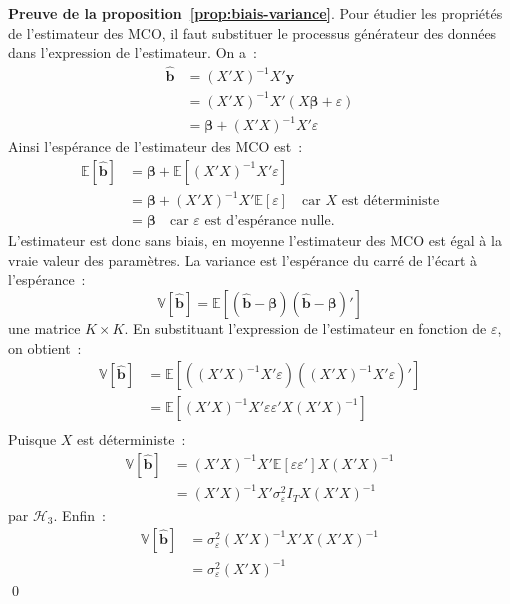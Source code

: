 \documentclass[10pt,a4paper]{article}
\theoremstyle{definition}
\begin{document}
\begin{notes}

  \textbf{Preuve de la proposition~\ref{prop:biais-variance}}. Pour étudier les propriétés de l'estimateur des MCO, il faut substituer le processus générateur des données dans l'expression de l'estimateur. On a~:
  \[
    \begin{split}
      \hat{\mathbf b} &= (X'X)^{-1}X'\mathbf y\\
                      &= (X'X)^{-1}X'\left( X\bm \beta + \varepsilon \right)\\
                      &= \bm \beta + (X'X)^{-1}X'\varepsilon
    \end{split}
  \]
  Ainsi l'espérance de l'estimateur des MCO est~:
  \[
    \begin{split}
      \mathbb E \left[ \hat{\mathbf b} \right] &= \bm \beta + \mathbb E\left[ (X'X)^{-1}X'\varepsilon \right]\\
                                               &= \bm \beta + (X'X)^{-1}X'\mathbb E\left[ \varepsilon \right]\quad\text{car $X$ est déterministe}\\
                                               &= \bm \beta\quad\text{car $\varepsilon$  est d'espérance nulle.}
    \end{split}
  \]
  L'estimateur est donc sans biais, en moyenne l'estimateur des MCO est égal à la vraie valeur des paramètres. La variance est l'espérance du carré de l'écart à l'espérance~:
  \[
    \mathbb V\left[ \hat{\mathbf b} \right] = \mathbb E\left[\left( \hat{\mathbf b}- \bm\beta \right)\left( \hat{\mathbf b}- \bm\beta \right)'\right]
  \]
  une matrice $K\times K$. En substituant l'expression de l'estimateur en fonction de $\varepsilon$, on obtient~:
\[
    \begin{split}
      \mathbb V\left[ \hat{\mathbf b} \right] &= \mathbb E\left[ \left( (X'X)^{-1}X'\varepsilon \right)\left( (X'X)^{-1}X'\varepsilon \right)' \right]\\
                                              &= \mathbb E\left[ (X'X)^{-1}X'\varepsilon\varepsilon' X (X'X)^{-1} \right]\\
    \end{split}
  \]
Puisque $X$ est déterministe~:
  \[
    \begin{split}
      \mathbb V\left[ \hat{\mathbf b} \right]
                                              &= (X'X)^{-1}X' \mathbb E\left[ \varepsilon\varepsilon' \right]X(X'X)^{-1}\\
                                              &= (X'X)^{-1}X' \sigma_\varepsilon^2I_T X(X'X)^{-1}
    \end{split}
  \]
  par $\mathcal H_3$. Enfin~:
\[
    \begin{split}
      \mathbb V\left[ \hat{\mathbf b} \right]
                                              &= \sigma_\varepsilon^2(X'X)^{-1}X'X(X'X)^{-1}\\
      &= \sigma_\varepsilon^2(X'X)^{-1}
    \end{split}
  \]
  \qed



\end{notes}
\end{document}
